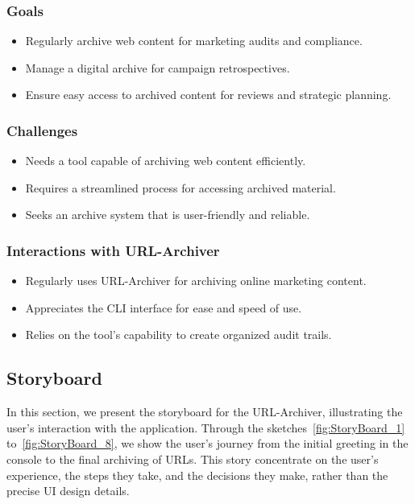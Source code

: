 \subsubsection{Goals}
\begin{itemize}
    \item Regularly archive web content for marketing audits and compliance.
    \item Manage a digital archive for campaign retrospectives.
    \item Ensure easy access to archived content for reviews and strategic planning.
\end{itemize}

\subsubsection{Challenges}
\begin{itemize}
    \item Needs a tool capable of archiving web content efficiently.
    \item Requires a streamlined process for accessing archived material.
    \item Seeks an archive system that is user-friendly and reliable.
\end{itemize}

\subsubsection{Interactions with URL-Archiver}
\begin{itemize}
    \item Regularly uses URL-Archiver for archiving online marketing content.
    \item Appreciates the CLI interface for ease and speed of use.
    \item Relies on the tool's capability to create organized audit trails.
\end{itemize}
\clearpage

\subsection{Storyboard}
In this section, we present the storyboard for the URL-Archiver, illustrating the user's interaction with the application.
Through the sketches~\ref{fig:StoryBoard_1} to~\ref{fig:StoryBoard_8}, we show the user's journey from the initial greeting in the console to the final archiving of URLs.
This story concentrate on the user's experience, the steps they take, and the decisions they make, rather than the precise UI design details.


